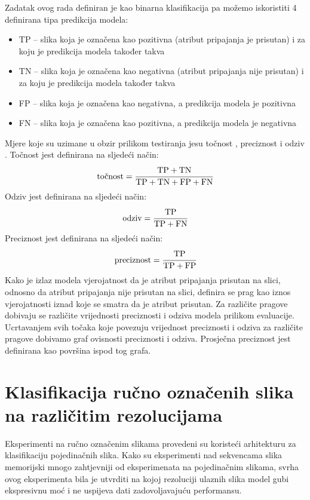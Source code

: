 \documentclass[times, utf8, diplomski, numeric]{fer}
\begin{document}
Zadatak ovog rada definiran je kao binarna klasifikacija pa možemo iskoristiti 4 definirana tipa predikcija modela: 
\begin{itemize}
 \item TP  -- slika koja je označena kao pozitivna (atribut pripajanja je prisutan) i za koju je predikcija modela također takva 
 \item TN  -- slika koja je označena kao negativna (atribut pripajanja nije prisutan) i za koju je predikcija modela također takva
 \item FP  -- slika koja je označena kao negativna, a predikcija modela je pozitivna
 \item FN  -- slika koja je označena kao pozitivna, a predikcija modela je negativna
\end{itemize}
Mjere koje su uzimane u obzir prilikom testiranja jesu točnost , preciznost  i odziv . 
Točnost jest definirana na sljedeći način:
\begin{align}
 \text{točnost} = \cfrac{\text{TP} + \text{TN}}{\text{TP} + \text{TN} + \text{FP} + \text{FN}}
\end{align}
Odziv jest definirana na sljedeći način:
\begin{align}
 \text{odziv} = \cfrac{\text{TP}}{\text{TP} + \text{FN}}
\end{align}
Preciznost jest definirana na sljedeći način:
\begin{align}
 \text{preciznost} = \cfrac{\text{TP}}{\text{TP} + \text{FP}}
\end{align}
Kako je izlaz modela vjerojatnost da je atribut pripajanja prisutan na slici, odnosno da atribut pripajanja nije prisutan na slici, definira se prag kao iznos vjerojatnosti iznad koje se smatra da je atribut prisutan.
Za različite pragove dobivaju se različite vrijednosti preciznosti i odziva modela prilikom evaluacije. 
Ucrtavanjem svih točaka koje povezuju vrijednost preciznosti i odziva za različite pragove dobivamo graf ovisnosti preciznosti i odziva.
Prosječna preciznost jest definirana kao površina ispod tog grafa.

\section{Klasifikacija ručno označenih slika na različitim rezolucijama}
Eksperimenti na ručno označenim slikama provedeni su koristeći arhitekturu za klasifikaciju pojedinačnih slika. 
Kako su eksperimenti nad sekvencama slika memorijski mnogo zahtjevniji od eksperimenata na pojedinačnim slikama, svrha ovog eksperimenta bila je utvrditi
na kojoj rezoluciji ulaznih slika model gubi ekspresivnu moć i ne uspijeva dati zadovoljavajuću performansu.
\end{document}
